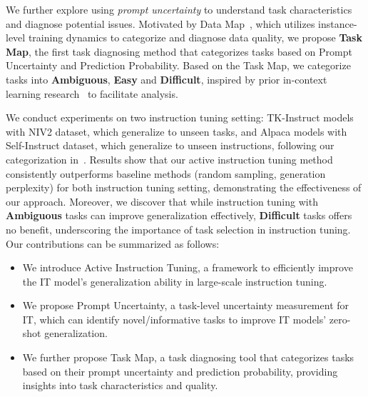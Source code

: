 
We further explore using \textit{prompt uncertainty} to understand task characteristics and diagnose potential issues. Motivated by Data Map~\cite{swayamdipta-etal-2020-dataset}, which utilizes instance-level training dynamics to categorize and diagnose data quality, we propose \textbf{Task Map}, the first task diagnosing method that categorizes tasks based on Prompt Uncertainty and Prediction Probability. Based on the Task Map, we 
categorize tasks into \textbf{Ambiguous}, \textbf{Easy} and \textbf{Difficult}, inspired by prior in-context learning research~\cite{xie2021explanation, pan2023context} to facilitate analysis. 

We conduct experiments on two instruction tuning setting: TK-Instruct models with NIV2 dataset, which generalize to unseen tasks, and Alpaca models with Self-Instruct dataset, which generalize to unseen instructions, following our categorization in~. Results %
show that our active instruction tuning method consistently outperforms baseline methods (random sampling, generation perplexity) for both instruction tuning setting, demonstrating the effectiveness of our approach.
Moreover, we discover that while instruction tuning with \textbf{Ambiguous} tasks can improve generalization effectively,  \textbf{Difficult} tasks offers no benefit, underscoring the importance of task selection in instruction tuning.
Our contributions can be summarized as follows:
\begin{itemize}
    \item We introduce Active Instruction Tuning, a framework to efficiently improve the IT model's generalization ability in large-scale instruction tuning. 
    \item We propose Prompt Uncertainty, a task-level uncertainty measurement for IT, which can identify novel/informative tasks to improve IT models' zero-shot generalization.
    \item We further propose Task Map, a task diagnosing tool that categorizes tasks based on their prompt uncertainty and prediction probability, providing insights into task characteristics and quality.
\end{itemize}


